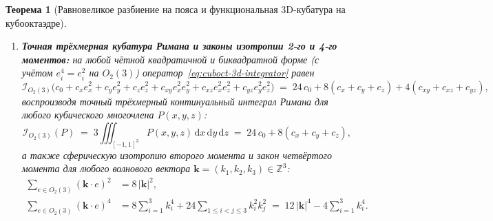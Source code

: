 \documentclass[11pt,a4paper]{article}
\theoremstyle{plain}
\newtheorem{theorem}{Теорема}[section]
\theoremstyle{definition}
\begin{document}
\begin{theorem}[Равновеликое разбиение на пояса и функциональная 3D-кубатура на кубооктаэдре]
\begin{enumerate}[label=\textbf{(\roman*)},leftmargin=*]
\item \textbf{Точная трёхмерная кубатура Римана и законы изотропии 2-го и 4-го моментов:}
  на любой чётной квадратичной и биквадратной форме (с учётом $e_i^4 = e_i^2$ на $O_2(3)$) оператор~\eqref{eq:cuboct-3d-integrator} равен
  \begin{equation}
    \label{eq:unified-even-cubature}
    \mathcal{I}_{O_2(3)}\!\bigl(c_0 + c_x e_x^2 + c_y e_y^2 + c_z e_z^2 + c_{xy} e_x^2 e_y^2 + c_{xz} e_x^2 e_z^2 + c_{yz} e_y^2 e_z^2\bigr)
    \;=\; 24\,c_0 + 8(c_x + c_y + c_z) + 4(c_{xy} + c_{xz} + c_{yz}),
  \end{equation}
  воспроизводя точный трёхмерный континуальный интеграл Римана для любого кубического многочлена $P(x, y, z)$:
  \begin{equation}
    \label{eq:riemann-3d-exact}
    \mathcal{I}_{O_2(3)}(P) \;=\; 3\iiint_{[-1,1]^3} P(x, y, z)\,\mathrm{d}x\,\mathrm{d}y\,\mathrm{d}z \;=\; 24\,c_0 + 8(c_x + c_y + c_z),
  \end{equation}
  а также сферическую изотропию второго момента и закон четвёртого момента для любого волнового вектора $\mathbf{k} = (k_1, k_2, k_3) \in \mathbb{Z}^3$:
  \begin{align}
    \sum_{e \in O_2(3)} (\mathbf{k}\cdot e)^2 &= 8\,|\mathbf{k}|^2, \label{eq:cuboct-isotropy-2} \\
    \sum_{e \in O_2(3)} (\mathbf{k}\cdot e)^4 &= 8\sum_{i=1}^3 k_i^4 + 24\sum_{1\le i<j\le 3} k_i^2 k_j^2 \;=\; 12\,|\mathbf{k}|^4 - 4\sum_{i=1}^3 k_i^4. \label{eq:cuboct-isotropy-4}
  \end{align}
\end{enumerate}
\end{theorem}
\end{document}
